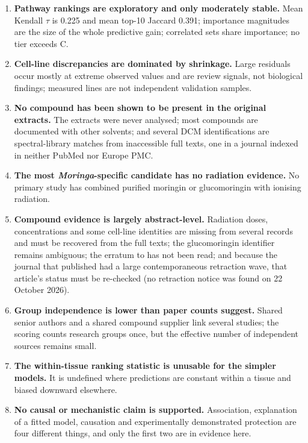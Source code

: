 \begin{enumerate}
  \item \textbf{Pathway rankings are exploratory and only moderately stable.} Mean Kendall
    $\tau$ is 0.225 and mean top-10 Jaccard 0.391; importance magnitudes are the size of the
    whole predictive gain; correlated sets share importance; no tier exceeds C.
  \item \textbf{Cell-line discrepancies are dominated by shrinkage.} Large residuals occur
    mostly at extreme observed values and are review signals, not biological findings;
    measured lines are not independent validation samples.
  \item \textbf{No compound has been shown to be present in the original extracts.} The
    extracts were never analysed; most compounds are documented with other solvents; and
    several DCM identifications are spectral-library matches from inaccessible full texts,
    one in a journal indexed in neither PubMed nor Europe PMC.
  \item \textbf{The most \textit{Moringa}-specific candidate has no radiation evidence.} No
    primary study has combined purified moringin or glucomoringin with ionising radiation.
  \item \textbf{Compound evidence is largely abstract-level.} Radiation doses, concentrations
    and some cell-line identities are missing from several records and must be recovered from
    the full texts; the glucomoringin identifier remains ambiguous; the erratum to
    \textcite{abedpour2022} has not been read; and because the journal that published
    \textcite{yin2022} had a large contemporaneous retraction wave, that article's status must
    be re-checked (no retraction notice was found on 22 October 2026).
  \item \textbf{Group independence is lower than paper counts suggest.} Shared senior authors
    and a shared compound supplier link several studies; the scoring counts research groups
    once, but the effective number of independent sources remains small.
  \item \textbf{The within-tissue ranking statistic is unusable for the simpler models.} It is
    undefined where predictions are constant within a tissue and biased downward elsewhere.
  \item \textbf{No causal or mechanistic claim is supported.} Association, explanation of a
    fitted model, causation and experimentally demonstrated protection are four different
    things, and only the first two are in evidence here.
\end{enumerate}
